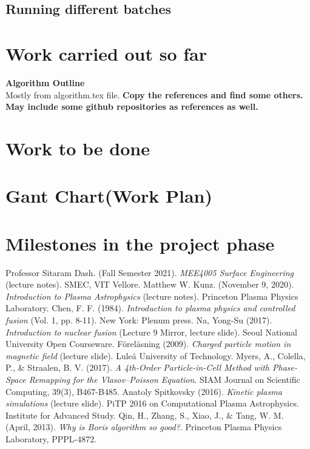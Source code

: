 \documentclass[12pt]{article}
\begin{document}
	\subsection{Running different batches}
	
	\section{Work carried out so far}
	
	\textbf{Algorithm Outline} \\
	Mostly from algorithm.tex file. \textbf{Copy the references and find some others. May include some github repositories as references as well.}
	
	\section{Work to be done}
	
	\section{Gant Chart(Work Plan)}
	
	\section{Milestones in the project phase}
	
	\begin{thebibliography}{}
		Professor Sitaram Dash. (Fall Semester 2021). \textit{MEE4005 Surface Engineering} (lecture notes). SMEC, VIT Vellore.
		Matthew W. Kunz. (November 9, 2020). \textit{Introduction to Plasma Astrophysics} (lecture notes). Princeton Plasma Physics Laboratory.
		Chen, F. F. (1984). \textit{Introduction to plasma physics and controlled fusion} (Vol. 1, pp. 8-11). New York: Plenum press.
		Na, Yong-Su (2017). \textit{Introduction to nuclear fusion} (Lecture 9 Mirror, lecture slide). Seoul National University Open Courseware.
		F\"{o}rel\"{a}sning (2009). \textit{Charged particle motion in magnetic field} (lecture slide). Lule\"{a} University of Technology.
		Myers, A., Colella, P., \& Straalen, B. V. (2017). \textit{A 4th-Order Particle-in-Cell Method with Phase-Space Remapping for the Vlasov--Poisson Equation}. SIAM Journal on Scientific Computing, 39(3), B467-B485.
		Anatoly Spitkovsky (2016). \textit{Kinetic plasma simulations} (lecture slide). PiTP 2016 on Computational Plasma Astrophysics. Institute for Advanced Study.
		Qin, H., Zhang, S., Xiao, J., $\&$ Tang, W. M. (April, 2013). \textit{Why is Boris algorithm so good?}. Princeton Plasma Physics Laboratory, PPPL-4872.
		
	\end{thebibliography}
\end{document}
